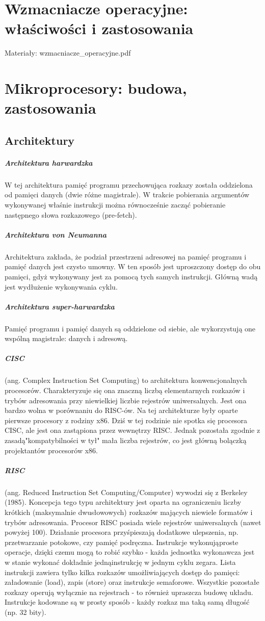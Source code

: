 \documentclass[a4paper,twoside]{report}
\begin{document}
\section{Wzmacniacze operacyjne: właściwości i zastosowania}
Materiały: wzmacniacze\_operacyjne.pdf
\section{Mikroprocesory: budowa, zastosowania}
\subsection{Architektury}
\subparagraph{Architektura harwardzka}
W tej architektura pamięć programu przechowująca rozkazy została oddzielona od pamięci danych (dwie różne magistrale). W trakcie pobierania argumentów wykonywanej właśnie instrukcji można równocześnie zacząć pobieranie następnego słowa rozkazowego (pre-fetch).

\subparagraph{Architektura von Neumanna}
Architektura zakłada, że podział przestrzeni adresowej na pamięć programu i pamięć danych jest czysto umowny. W ten sposób jest uproszczony dostęp do obu pamięci, gdyż wykonywany jest za pomocą tych samych instrukcji. Główną wadą jest wydłużenie wykonywania cyklu.

\subparagraph{Architektura super-harwardzka}
Pamięć programu i pamięć danych są oddzielone od siebie, ale wykorzystują one wspólną magistrale: danych i adresową.

\subparagraph{CISC} (ang. Complex Instruction Set Computing) to architektura konwencjonalnych procesorów. Charakteryzuje się ona znaczną liczbą elementarnych rozkazów i trybów adresowania przy niewielkiej liczbie rejestrów uniwersalnych. Jest ona bardzo wolna w porównaniu do RISC-ów. Na tej architekturze były oparte pierwsze procesory z rodziny x86. Dziś w tej rodzinie nie spotka się procesora CISC, ale jest ona zastąpiona przez wewnętrzy RISC. Jednak pozostała zgodnie z zasadą"kompatybilności w tył" mała liczba rejestrów, co jest główną bolączką projektantów procesorów x86.

\subparagraph{RISC} (ang. Reduced Instruction Set Computing/Computer) wywodzi się z Berkeley (1985). Koncepcja tego typu architektury jest oparta na ograniczeniu liczby krótkich (maksymalnie dwusłowowych) rozkazów mających niewiele formatów i trybów adresowania. Procesor RISC posiada wiele rejestrów uniwersalnych (nawet powyżej 100). Działanie procesora przyśpieszają dodatkowe ulepszenia, np. przetwarzanie potokowe, czy pamięć podręczna. Instrukcje wykonująproste operacje, dzięki czemu mogą to robić szybko - każda jednostka wykonawcza jest w stanie wykonać dokładnie jednąinstrukcję w jednym cyklu zegara. Lista instrukcji zawiera tylko kilka rozkazów umożliwiających dostęp do pamięci: załadowanie (load), zapis (store) oraz instrukcje semaforowe. Wszystkie pozostałe rozkazy operują wyłącznie na rejestrach - to również upraszcza budowę układu. Instrukcje kodowane są w prosty sposób - każdy rozkaz ma taką samą długość (np. 32 bity).
\end{document}
